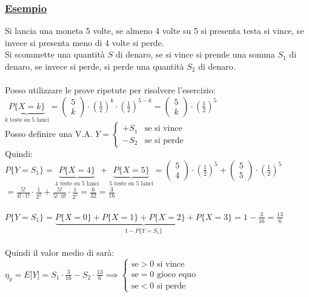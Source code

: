 \documentclass{article}
\begin{document}
\subsubsection{\underline{Esempio}}
Si lancia una moneta 5 volte, se almeno 4 volte su 5 si presenta testa si vince, se invece si presenta meno di 4 volte si perde. \\
Si scommette una quantità $S$ di denaro, se si vince si prende una somma $S_1$ di denaro, se invece si perde, si perde una quantità $S_2$ di denaro. \\ \\
Posso utilizzare le prove ripetute per risolvere l’esercizio: \\
$\underset{k \text{ teste su 5 lanci}}{\underbrace{P \big\{ X = k\big\}}} = \left(\begin{matrix} 5 \\ k\end{matrix}\right) \cdot \left(\frac 12\right)^k \cdot \left(\frac 12\right)^{5-k} = \left(\begin{matrix} 5 \\ k\end{matrix}\right) \cdot \left(\frac 12\right)^5$ \\
Posso definire una V.A. $Y = \begin{cases}
+S_1 & \text{se si vince} \\
-S_2 & \text{se si perde} 
\end{cases}$ \\
Quindi: \\
$P\big\{Y = S_1 \big\} = \underset{\text{4 teste su 5 lanci}}{\underbrace{P\big\{X = 4 \big\}}} + \underset{\text{5 teste su 5 lanci}}{\underbrace{P\big\{X = 5 \big\}}}
=
\left(\begin{matrix} 5 \\ 4 \end{matrix}\right) \cdot \left(\frac 12\right)^5 + \left(\begin{matrix} 5 \\ 5 \end{matrix}\right) \cdot \left(\frac 12\right)^5
$ 
$= \frac{5!}{4! \cdot 1! } \cdot \frac{1}{2^5} + \frac{5!}{5! \cdot 0! } \cdot \frac{1}{2^5} = \frac{6}{32} = \frac{3}{16}$ \\ \\
$P\big\{Y = S_1 \big\} = \underset{1 - P\big\{Y = S_1 \big\} }{\underbrace{ P\big\{X = 0 \big\} + P\big\{X = 1 \big\} + P\big\{X = 2 \big\} + P\big\{X = 3 \big\}}} 
=
1 - \frac{3}{16} = \frac{13}{6}$ \\ \\
Quindi il valor medio di  sarà: $\eta_y = E\big[Y\big] = S_1 \cdot \frac{3}{16} - S_2 \cdot \frac{13}{6} \implies 
\begin{cases}
\text{se} > 0 \text{ si vince}\\
\text{se} = 0 \text{ gioco equo}\\
\text{se} < 0 \text{ si perde}
\end{cases}$
\end{document}
